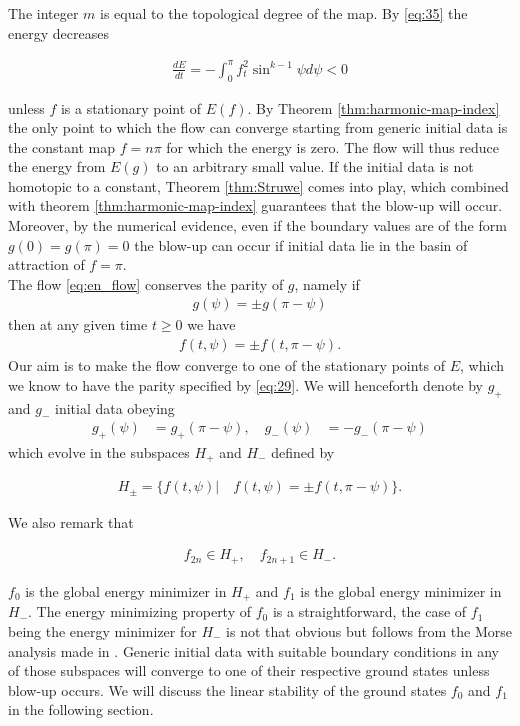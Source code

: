 The integer $m$ is equal to the topological degree of the map.  By
\eqref{eq:35} the energy decreases

\begin{align}
  \label{eq:36}
  \frac{dE}{dt}=-\int_0^{\pi}f_t^2\sin^{k-1}\psi d\psi<0
\end{align}

unless $f$ is a stationary point of $E(f)$. By Theorem
\ref{thm:harmonic-map-index} the only point to which the flow can
converge starting from generic initial data is the constant map
$f=n\pi$ for which the energy is zero. The flow will thus reduce the
energy from $E(g)$ to an arbitrary small value. If the initial data is
not homotopic to a constant, Theorem \ref{thm:Struwe} comes into play,
which combined with theorem \ref{thm:harmonic-map-index} guarantees
that the blow-up will occur. Moreover, by the numerical evidence, even
if the boundary values are of the form $g(0)=g(\pi)=0$ the blow-up can
occur if initial data lie in the basin of attraction of $f=\pi$.\\

The flow \eqref{eq:en_flow} conserves the parity of $g$, namely if
\begin{align}
  \label{eq:37}
  g(\psi)=\pm g(\pi-\psi)
\end{align}
then at any given time $t\ge0$ we have
\begin{align}\label{eq:38}
  f(t,\psi)=\pm f(t,\pi-\psi).
\end{align}
Our aim is to make the flow converge to one of the stationary points
of $E$, which we know to have the parity specified by
\eqref{eq:29}. We will henceforth denote by $g_+$ and $g_-$ initial
data obeying
\begin{align}
  \label{eq:39}
  g_+(\psi)&=g_+(\pi-\psi),\quad
  g_-(\psi)&=-g_-(\pi-\psi)
\end{align}
which evolve in the subspaces $H_+$ and $H_-$ defined by

\begin{align}
  \label{eq:40}
  H_\pm=\{f(t,\psi)|\quad f(t,\psi)=\pm f(t,\pi-\psi)\}.
\end{align}

We also remark that

\begin{align}
  \label{eq:41}
  f_{2n}\in H_+,\quad f_{2n+1}\in H_-.
\end{align}

$f_0$ is the global energy minimizer in $H_+$ and $f_1$ is the global
energy minimizer in $H_-$. The energy minimizing property of $f_0$ is
a straightforward, the case of $f_1$ being the energy minimizer for
$H_-$ is not that obvious but follows from the Morse analysis made in
\cite{Corlette2001}. Generic initial data with suitable boundary
conditions in any of those subspaces will converge to one of their
respective ground states unless blow-up occurs. We will discuss the
linear stability of the ground states $f_0$ and $f_1$ in the following
section.

